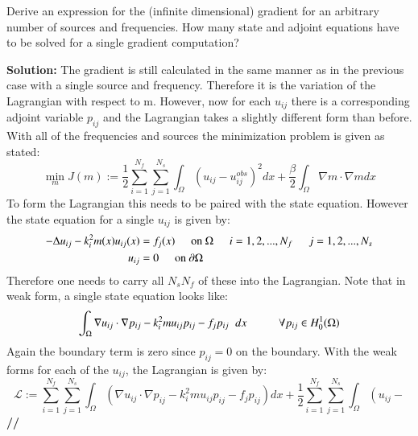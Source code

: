 \documentclass[11pt]{article}
\newenvironment{solution}{\begin{trivlist}\item[]{\bf Solution:}}
                      {\textbf{//} \end{trivlist}}
\begin{document}
\begin{enumerate}
\item[(c)] Derive an expression for the (infinite dimensional) gradient
	   for an arbitrary number of sources and frequencies. How many
	   state and adjoint equations have to be solved for a single
	   gradient computation? 

\begin{solution}
The gradient is still calculated in the same manner as in the previous
 case with a single source and frequency. Therefore it is the variation
 of the Lagrangian with respect to m. However, now for each $u_{ij}$
 there is a corresponding adjoint variable $p_{ij}$ and the Lagrangian
 takes a slightly different form than before. With all of the
 frequencies and sources the minimization problem is given as stated: 
\begin{displaymath}
\min_m J(m) :=
 \frac{1}{2}\sum_{i=1}^{N_f}\sum_{j=1}^{N_s}\int_{\Omega}\left(u_{ij} -
 u_{ij}^{obs}\right)^2 dx + \frac{\beta}{2}\int_{\Omega}\nabla m \cdot
 \nabla m dx 
\end{displaymath}
To form the Lagrangian this needs to be paired with the state equation. However the state equation for a single $u_{ij}$ is given by:
\begin{align}
-\Delta u_{ij} - k_i^2m(x)u_{ij}(x) &= f_j(x)\hspace{5 mm} \text{on }
 \Omega \hspace{5 mm} i = 1, 2, ..., N_f \hspace{5 mm} j = 1, 2, ...,
 N_s \nonumber \\ 
u_{ij} &= 0 \hspace{5 mm} \text{on } \partial\Omega \nonumber
\end{align}
Therefore one needs to carry all $N_sN_f$ of these into the
 Lagrangian. Note that in weak form, a single state equation looks like: 
\begin{displaymath} 
\int_{\Omega}\nabla u_{ij} \cdot \nabla p_{ij} - k_i^2mu_{ij}p_{ij} -
 f_jp_{ij}\hspace{2 mm}dx \hspace{1 cm} \forall p_{ij} \in H^1_0(\Omega) 
\end{displaymath}
Again the boundary term is zero since $p_{ij} = 0$ on the boundary. With
 the weak forms for each of the $u_{ij}$, the Lagrangian is given by: 
\begin{displaymath}
\mathcal{L} := \sum_{i=1}^{N_f}\sum_{j=1}^{N_s}\int_{\Omega}\left(\nabla
 u_{ij} \cdot \nabla p_{ij} - k_i^2mu_{ij}p_{ij} - f_jp_{ij}\right)dx +
 \frac{1}{2}\sum_{i=1}^{N_f}\sum_{j=1}^{N_s}\int_{\Omega}\left(u_{ij} -

\end{displaymath}
\end{solution}
\end{enumerate}
\end{document}
